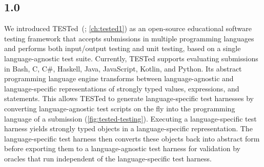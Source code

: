 \documentclass[../main]{subfiles}
\begin{document}
\subsection{\tested{} 1.0}\label{subsec:tested-1.0}

We introduced TESTed~(\cite{strijbolTESTedEducationalTesting2023}; \cref{ch:tested1}) as an open-source educational software testing framework that accepts submissions in multiple programming languages and performs both input/output testing and unit testing, based on a single language-agnostic test suite.
Currently, TESTed supports evaluating submissions in Bash, C, C\#, Haskell, Java, JavaScript, Kotlin, and Python.
Its abstract programming language engine transforms between language-agnostic and language-specific representations of strongly typed values, expressions, and statements.
This allows TESTed to generate language-specific test harnesses by converting language-agnostic test scripts on the fly into the programming language of a submission (\cref{fig:tested-testing}).
Executing a language-specific test harness yields strongly typed objects in a language-specific representation.
The language-specific test harness then converts these objects back into abstract form before exporting them to a language-agnostic test harness for validation by oracles that run independent of the language-specific test harness.
\end{document}
